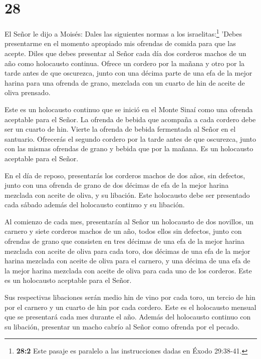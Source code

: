 \hypertarget{section-27}{%
\section{28}\label{section-27}}

 El Señor le dijo a Moisés:  Dales las
siguientes normas a los israelitas:\footnote{\textbf{28:2} Este pasaje
  es paralelo a las instrucciones dadas en Éxodo 29:38-41.} 'Debes
presentarme en el momento apropiado mis ofrendas de comida para que las
acepte.  Diles que debes presentar al Señor cada día dos
corderos machos de un año como holocausto continua.  Ofrece
un cordero por la mañana y otro por la tarde antes de que oscurezca,
 junto con una décima parte de una efa de la mejor harina
para una ofrenda de grano, mezclada con un cuarto de hin de aceite de
oliva prensado.

 Este es un holocausto continuo que se inició en el Monte
Sinaí como una ofrenda aceptable para el Señor.  La ofrenda
de bebida que acompaña a cada cordero debe ser un cuarto de hin. Vierte
la ofrenda de bebida fermentada al Señor en el santuario. 
Ofrecerás el segundo cordero por la tarde antes de que oscurezca, junto
con las mismas ofrendas de grano y bebida que por la mañana. Es un
holocausto aceptable para el Señor.

 En el día de reposo, presentarás los corderos machos de dos
años, sin defectos, junto con una ofrenda de grano de dos décimas de efa
de la mejor harina mezclada con aceite de oliva, y su libación.
 Este holocausto debe ser presentado cada sábado además del
holocausto continuo y su libación.

 Al comienzo de cada mes, presentarán al Señor un
holocausto de dos novillos, un carnero y siete corderos machos de un
año, todos ellos sin defectos,  junto con ofrendas de grano
que consisten en tres décimas de una efa de la mejor harina mezclada con
aceite de oliva para cada toro, dos décimas de una efa de la mejor
harina mezclada con aceite de oliva para el carnero,  y una
décima de una efa de la mejor harina mezclada con aceite de oliva para
cada uno de los corderos. Este es un holocausto aceptable para el Señor.

 Sus respectivas libaciones serán medio hin de vino por
cada toro, un tercio de hin por el carnero y un cuarto de hin por cada
cordero. Este es el holocausto mensual que se presentará cada mes
durante el año.  Además del holocausto continuo con su
libación, presentar un macho cabrío al Señor como ofrenda por el pecado.

